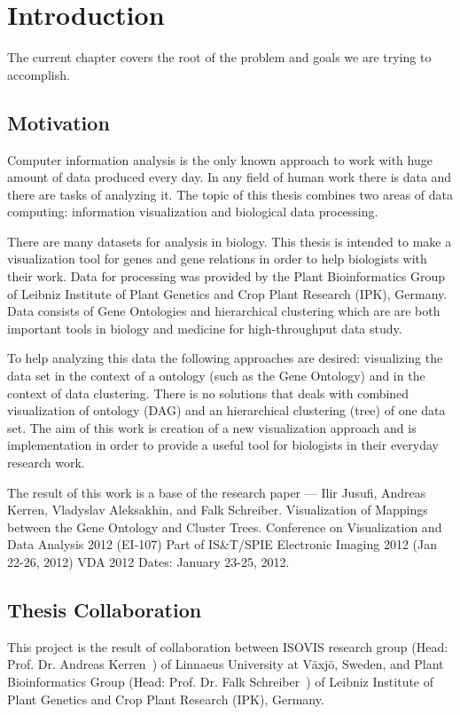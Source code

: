 \section{Introduction}
\label{sec:introduction}

The current chapter covers the root of the problem and goals we are trying to accomplish.

\subsection{Motivation}
\label{sec:motivation}

Computer information analysis is the only known approach to work with huge amount of data produced every day. In any field of human work there is data and there are tasks of analyzing it. The topic of this thesis combines two areas of data computing: information visualization and biological data processing.

There are many datasets for analysis in biology. This thesis is intended to make a visualization tool for genes and gene relations in order to help biologists with their work. Data for processing was provided by the Plant Bioinformatics Group of Leibniz Institute of Plant Genetics and Crop Plant Research (IPK), Germany. Data consists of Gene Ontologies and hierarchical clustering which are are both important tools in biology and medicine for high-throughput data study.

To help analyzing this data the following approaches are desired: visualizing the data set in the context of a ontology (such as the Gene Ontology) and in the context of data clustering. There is no solutions that deals with combined visualization of ontology (DAG) and an hierarchical clustering (tree) of one data set. The aim of this work is creation of a new visualization approach and is implementation in order to provide a useful tool for biologists in their everyday research work.

The result of this work is a base of the research paper --- \textsf{Ilir Jusufi, Andreas Kerren, Vladyslav Aleksakhin, and Falk Schreiber. Visualization of Mappings between the Gene Ontology and Cluster Trees. Conference on Visualization and Data Analysis 2012 (EI-107) Part of IS&T/SPIE Electronic Imaging 2012 (Jan 22-26, 2012) VDA 2012 Dates: January 23-25, 2012.}

\subsection{Thesis Collaboration}
This project is the result of collaboration between ISOVIS research group (Head: Prof. Dr. Andreas Kerren~\cite{Kerren}) of Linnaeus University at V\"axj\"o, Sweden, and Plant Bioinformatics Group (Head: Prof. Dr. Falk Schreiber~\cite{Schreiber}) of Leibniz Institute of Plant Genetics and Crop Plant Research (IPK), Germany.


